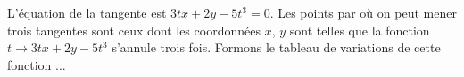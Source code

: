 L'équation de la tangente est $3tx+2y-5t^3=0$. Les points par où on peut mener trois tangentes sont ceux dont les coordonnées $x$, $y$ sont telles que la fonction $t \rightarrow 3tx+2y-5t^3$ s'annule trois fois. Formons le tableau de variations de cette fonction ...